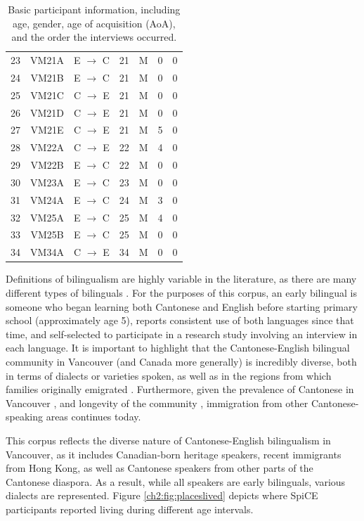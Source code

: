 \begin{table}[!htbp]
\begin{center}
\begin{tabular}{ccccccc}
  23  & VM21A & E $\rightarrow$ C & 21  & M & 0   & 0 \\
  24  & VM21B & E $\rightarrow$ C & 21  & M & 0   & 0 \\
  25  & VM21C & C $\rightarrow$ E & 21  & M & 0   & 0 \\
  26  & VM21D & C $\rightarrow$ E & 21  & M & 0   & 0 \\
  27  & VM21E & C $\rightarrow$ E & 21  & M & 5   & 0 \\
  28  & VM22A & C $\rightarrow$ E & 22  & M & 4   & 0 \\
  29  & VM22B & E $\rightarrow$ C & 22  & M & 0   & 0 \\
  30  & VM23A & E $\rightarrow$ C & 23  & M & 0   & 0 \\
  31  & VM24A & E $\rightarrow$ C & 24  & M & 3   & 0 \\
  32  & VM25A & E $\rightarrow$ C & 25  & M & 4   & 0 \\
  33  & VM25B & E $\rightarrow$ C & 25  & M & 0   & 0 \\
  34  & VM34A & C $\rightarrow$ E & 34  & M & 0   & 0 \\
  \bottomrule
  
  \end{tabular}
  \caption{Basic participant information, including age, gender, age of acquisition (AoA), and the order the interviews occurred.}
  \label{ch2:tab:participants}
  \end{center}
  \end{table}

Definitions of bilingualism are highly variable in the literature, as there are many different types of bilinguals \citep{amengual_2017_type}. For the purposes of this corpus, an early bilingual is someone who began learning both Cantonese and English before starting primary school (approximately age 5), reports consistent use of both languages since that time, and self-selected to participate in a research study involving an interview in each language. It is important to highlight that the Cantonese-English bilingual community in Vancouver (and Canada more generally) is incredibly diverse, both in terms of dialects or varieties spoken, as well as in the regions from which families originally emigrated \citep{yu_2013_diaspora}. Furthermore, given the prevalence of Cantonese in Vancouver \citep{statistics_2017_proportion}, and longevity of the community \citep{yu_2013_diaspora}, immigration from other Cantonese-speaking areas continues today. 

This corpus reflects the diverse nature of Cantonese-English bilingualism in Vancouver, as it includes Canadian-born heritage speakers, recent immigrants from Hong Kong, as well as Cantonese speakers from other parts of the Cantonese diaspora. As a result, while all speakers are early bilinguals, various dialects are represented. Figure \ref{ch2:fig:placeslived} depicts where SpiCE participants reported living during different age intervals.

